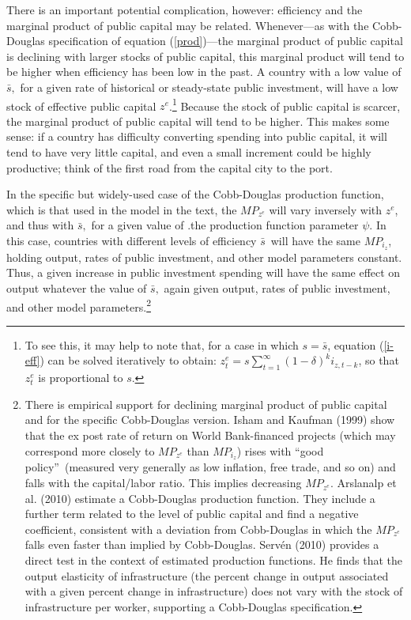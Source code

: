 \documentclass[11pt]{article}
\begin{document}
\begin{appendix}
There is an important potential complication, however: efficiency and the
marginal product of public capital may be related. Whenever---as with the
Cobb-Douglas specification of equation (\ref{prod})---the marginal product
of public capital is declining with larger stocks of public capital, this
marginal product will tend to be higher when efficiency has been low in the
past. A country with a low value of $\bar{s},$ for a given rate of
historical or steady-state public investment, will have a low stock of
effective public capital $z^{e}$.\footnote{%
To see this, it may help to note that, for a case in which $s=\bar{s}$,
equation (\ref{i-eff}) can be solved iteratively to obtain: $%
z_{t}^{e}=s\sum_{t=1}^{\infty }(1-\delta )^{k}i_{z,t-k}$, so that $z_{t}^{e}$
is proportional to $s$.} Because the stock of public capital is scarcer, the
marginal product of public capital will tend to be higher. This makes some
sense: if a country has difficulty converting spending into public capital,
it will tend to have very little capital, and even a small increment could
be highly productive; think of the first road from the capital city to the
port.

In the specific but widely-used case of the Cobb-Douglas production
function, which is that used in the model in the text, the $MP_{z^{e}}$ will
vary inversely with $z^{e}$, and thus with $\bar{s},$ for a given value of
.the production function parameter $\psi $. In this case, countries with
different levels of efficiency $\bar{s}$\ will have the same $MP_{i_{z}}$,
holding output, rates of public investment, and other model parameters
constant. Thus, a given increase in public investment spending will have the
same effect on output whatever the value of $\bar{s},$ again given output,
rates of public investment, and other model parameters.\footnote{%
There is empirical support for declining marginal product of public capital
and for the specific Cobb-Douglas version. Isham and Kaufman (1999) show
that the ex post rate of return on World Bank-financed projects (which may
correspond more closely to $MP_{z^{e}}$ than $MP_{i_{z}}$) rises with
\textquotedblleft good policy\textquotedblright\ (measured very generally as
low inflation, free trade, and so on) and falls with the capital/labor
ratio. This implies decreasing $MP_{z^{e}}$. Arslanalp et al. (2010)
estimate a Cobb-Douglas production function. They include a further term
related to the level of public capital and find a negative coefficient,
consistent with a deviation from Cobb-Douglas in which the $MP_{z^{e}}$
falls even faster than implied by Cobb-Douglas. Serv\'{e}n (2010) provides a
direct test in the context of estimated production functions. He finds that
the output elasticity of infrastructure (the percent change in output
associated with a given percent change in infrastructure) does not vary with
the stock of infrastructure per worker, supporting a Cobb-Douglas
specification.}


\end{appendix}
\end{document}
